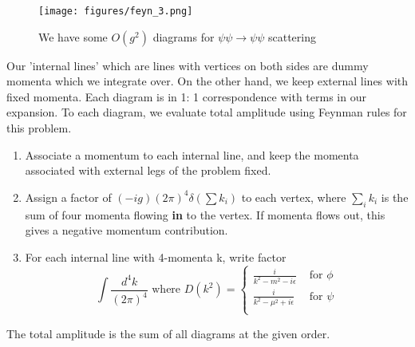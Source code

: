 \begin{figure}[htpb]
\centering
\texttt{[image: figures/feyn\_3.png]}
\caption{We have some $ O ( g ^ 2 )$ diagrams for $ \psi \psi \to \psi \psi$ scattering}%
\label{fig:figures/feyn_3}
\end{figure}
Our 'internal lines' which are lines with vertices on
both sides are dummy momenta which we integrate over. 
On the other hand, we keep external lines with fixed momenta. 
Each diagram is in 1: 1 correspondence with 
terms in our expansion. 
To each diagram, we evaluate total amplitude using 
Feynman rules for this problem. 
\begin{enumerate}
\item Associate a momentum to each internal line, and keep 
the momenta associated with external legs of the problem 
fixed. 
\item Assign a factor of  $ ( - i g) ( 2 \pi ) ^ 4 \delta ( \sum k_ i ) $
to each vertex, where  $ \sum_i k _ i $ is the sum of 
four momenta flowing \textbf{ in } to the vertex. If momenta 
flows out, this gives a negative momentum contribution. 
\item For each internal line with 4-momenta k, write 
factor 
\[
	\int \frac{ d^ 4 k }{ ( 2 \pi ) ^ 4  } \text{ where } D ( k ^ 2 )  = \begin{cases}
		\frac{ i }{ k ^ 2 - m ^ 2  - i \epsilon } &  \text{ for } \phi \\
		\frac{i }{ k ^ 2 - \mu ^ 2 + i \epsilon } & \text{ for } \psi \\ 
	\end{cases}
\] 
\end{enumerate}
The total amplitude is the sum of all diagrams at the given order. 

